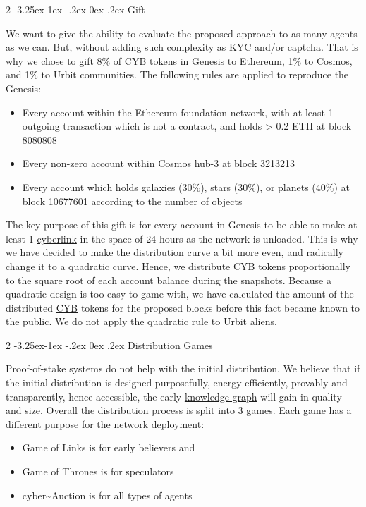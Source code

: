 \documentclass[8pt,oneside]{amsart}
\makeatletter
\newcommand{\linkred}[2]{\href{#1}{\color{red}{#2}}}
\renewcommand\subsection{\@startsection{subsection}
                                    {2}{\z@}
                                    {-3.25ex\@plus -1ex \@minus -.2ex}
                                    {0ex \@plus .2ex}
                                    {\play\Large}
                        }
\newcommand{\titleSection}[1]{\subsection{#1}}
\makeatother
\begin{document}
\titleSection{Gift}\label{gift}

We want to give the ability to evaluate the proposed approach to as many agents as we can. But, without adding such complexity as KYC and/or captcha. That is why we chose to gift 8\% of {\hyperref[cyb]{CYB}} tokens in Genesis to Ethereum, 1\% to Cosmos, and 1\% to Urbit communities. The following rules are applied to reproduce the Genesis:
\begin{itemize}
 \item Every account within the Ethereum foundation network, with at least 1 outgoing transaction which is not a contract, and holds > 0.2 ETH at block 8080808
 \item Every non-zero account within Cosmos hub-3 at block 3213213
 \item Every account which holds galaxies (30\%), stars (30\%), or planets (40\%) at block 10677601 according to the number of objects
\end{itemize}

The key purpose of this gift is for every account in Genesis to be able to make at least 1 {\hyperref[cyberlinks]{cyberlink}} in the space of 24 hours as the network is unloaded. This is why we have decided to make the distribution curve a bit more even, and radically change it to a quadratic curve. Hence, we distribute {\hyperref[cyb]{CYB}} tokens proportionally to the square root of each account balance during the snapshots. Because a quadratic design is too easy to game with, we have calculated the amount of the distributed {\hyperref[cyb]{CYB}} tokens for the proposed blocks before this fact became known to the public. We do not apply the quadratic rule to Urbit aliens.

\titleSection{Distribution Games}\label{distribution-games}

Proof-of-stake systems do not help with the initial distribution. We believe that if the initial distribution is designed purposefully, energy-efficiently, provably and transparently, hence accessible, the early {\hyperref[knowledge-graph]{knowledge graph}} will gain in quality and size. Overall the distribution process is split into 3 games. Each game has a different purpose for the {\hyperref[deployment]{network deployment}}:

\begin{itemize}
\item Game of Links is for early believers and \linkred{https://cybercongress.ai/docs/go-cyber/run_validator/}{Genesis heroes}
\item Game of Thrones is for speculators
\item cyber\~{}Auction is for all types of agents
\end{itemize}
\end{document}
